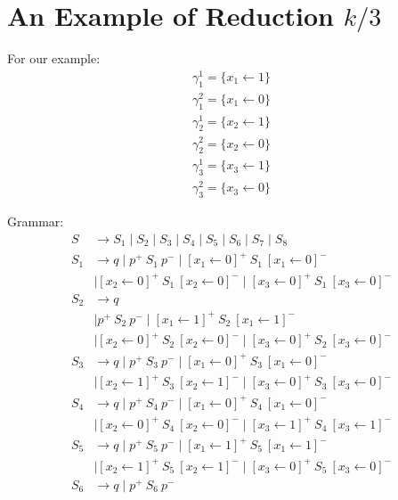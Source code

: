 \section{An Example of Reduction $k/3$}

For our example:
\begin{align*}
\gamma_1^1 = \{x_1 \leftarrow 1 \} \\
\gamma_1^2 = \{x_1 \leftarrow 0 \} \\
\gamma_2^1 = \{x_2 \leftarrow 1 \} \\
\gamma_2^2 = \{x_2 \leftarrow 0 \} \\
\gamma_3^1 = \{x_3 \leftarrow 1 \} \\
\gamma_3^2 = \{x_3 \leftarrow 0 \} 
\end{align*}

Grammar:
\begin{align*}
S & \to S_1 \mid S_2 \mid S_3 \mid S_4 \mid S_5 \mid S_6 \mid S_7 \mid S_8\\
S_1 & \to q \mid p^+ \ S_1 \ p^- 
      \mid [x_1 \leftarrow 0]^+ \ S_1 \ [x_1 \leftarrow 0]^- \\ 
    & \mid [x_2 \leftarrow 0]^+ \ S_1 \ [x_2 \leftarrow 0]^- 
      \mid [x_3 \leftarrow 0]^+ \ S_1 \ [x_3 \leftarrow 0]^- \\
S_2 & \to q \\
    & \mid p^+ \ S_2 \ p^- 
      \mid [x_1 \leftarrow 1]^+ \ S_2 \ [x_1 \leftarrow 1]^- \\ 
    & \mid [x_2 \leftarrow 0]^+ \ S_2 \ [x_2 \leftarrow 0]^- 
      \mid [x_3 \leftarrow 0]^+ \ S_2 \ [x_3 \leftarrow 0]^- \\
S_3 & \to q \mid p^+ \ S_3 \ p^- 
      \mid [x_1 \leftarrow 0]^+ \ S_3 \ [x_1 \leftarrow 0]^- \\ 
    & \mid [x_2 \leftarrow 1]^+ \ S_3 \ [x_2 \leftarrow 1]^- 
      \mid [x_3 \leftarrow 0]^+ \ S_3 \ [x_3 \leftarrow 0]^- \\
S_4 & \to q \mid p^+ \ S_4 \ p^- 
      \mid [x_1 \leftarrow 0]^+ \ S_4 \ [x_1 \leftarrow 0]^- \\ 
    & \mid [x_2 \leftarrow 0]^+ \ S_4 \ [x_2 \leftarrow 0]^- 
      \mid [x_3 \leftarrow 1]^+ \ S_4 \ [x_3 \leftarrow 1]^- \\
S_5 & \to q \mid p^+ \ S_5 \ p^- 
      \mid [x_1 \leftarrow 1]^+ \ S_5 \ [x_1 \leftarrow 1]^- \\ 
    & \mid [x_2 \leftarrow 1]^+ \ S_5 \ [x_2 \leftarrow 1]^- 
      \mid [x_3 \leftarrow 0]^+ \ S_5 \ [x_3 \leftarrow 0]^- \\
S_6 & \to q \mid p^+ \ S_6 \ p^- 

\end{align*}

